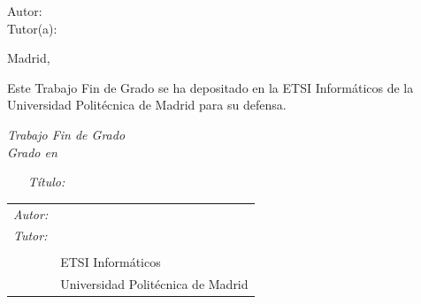 \begin{titlepage}
\vspace*{0.5cm}
\begin{center}
\huge\bfseries {  \TituloTFG{} } 
\end{center}

\vspace*{5cm}

\noindent
\large{Autor: \NombreAutor{} }\\
\large{Tutor(a): \NombreTutor{} }


\vspace*{3cm}
\begin{center}
Madrid, \Fecha
\end{center}

\newpage
\thispagestyle{empty}
\noindent
Este Trabajo Fin de Grado se ha depositado en la ETSI Informáticos de la Universidad Politécnica de Madrid para su defensa.

\vspace*{4cm}
\noindent
\textit{Trabajo Fin de Grado}\\
\textit{Grado en} \Grado{}

\begin{enumerate}
\item[\textit{Título:}] \TituloTFG{}
\end{enumerate}
\Fecha


\vspace*{3cm}

\noindent
\begin{tabular}{ll}
\textit{Autor:} & \NombreAutor{}  \\ 
\textit{Tutor:} & \NombreTutor{}  \\ 
                & \Departamento{} \\
                & ETSI Informáticos\\
                & Universidad Politécnica de Madrid
\end{tabular} 

\end{titlepage}
